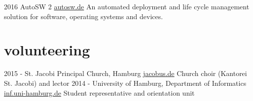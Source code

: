 \documentclass[]{friggeri-cv}
\begin{document}
\begin{entrylist}
 \entry
    {2016}
    {AutoSW 2}
    {\href{https://www.autosw.de/Demo/Benefit}{autosw.de}}
    {An automated deployment and life cycle management solution for software, operating systems and devices.}
\end{entrylist}

\section{volunteering}

  \begin{entrylist}
    \entry
      {2015 - }
      {St. Jacobi Principal Church, Hamburg}
      {\href{http://www.jacobus.de}{jacobus.de}}
      {Church choir (Kantorei St. Jacobi) and lector}
    \entry
      {2014 - }
      {University of Hamburg, Department of Informatics}
      {\href{https://www.inf.uni-hamburg.de/en.html}{inf.uni-hamburg.de}}
      {Student representative and orientation unit}
  \end{entrylist}
\end{document}
